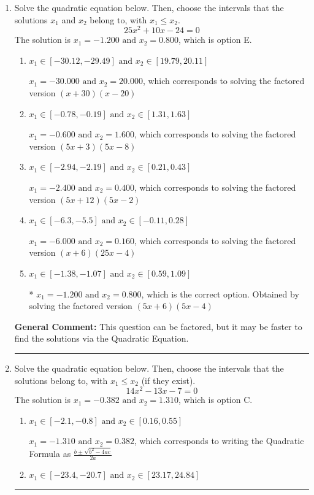 \documentclass{extbook}[14pt]
\newcommand{\litem}[1]{\item #1

\rule{\textwidth}{0.4pt}}
\begin{document}
\begin{enumerate}\litem{
Solve the quadratic equation below. Then, choose the intervals that the solutions $x_1$ and $x_2$ belong to, with $x_1 \leq x_2$.
\[ 25x^{2} +10 x -24 = 0 \]The solution is \( x_1 = -1.200 \text{ and } x_2 = 0.800 \), which is option E.\begin{enumerate}[label=\Alph*.]
\item \( x_1 \in [-30.12, -29.49] \text{ and } x_2 \in [19.79, 20.11] \)

$x_1 = -30.000 \text{ and } x_2 = 20.000$, which corresponds to solving the factored version $(x + 30)(x -20)$
\item \( x_1 \in [-0.78, -0.19] \text{ and } x_2 \in [1.31, 1.63] \)

$x_1 = -0.600 \text{ and } x_2 = 1.600$, which corresponds to solving the factored version $(5x + 3)(5x -8)$
\item \( x_1 \in [-2.94, -2.19] \text{ and } x_2 \in [0.21, 0.43] \)

$x_1 = -2.400 \text{ and } x_2 = 0.400$, which corresponds to solving the factored version $(5x + 12)(5x -2)$
\item \( x_1 \in [-6.3, -5.5] \text{ and } x_2 \in [-0.11, 0.28] \)

$x_1 = -6.000 \text{ and } x_2 = 0.160$, which corresponds to solving the factored version $(x + 6)(25x -4)$
\item \( x_1 \in [-1.38, -1.07] \text{ and } x_2 \in [0.59, 1.09] \)

* $x_1 = -1.200 \text{ and } x_2 = 0.800$, which is the correct option. Obtained by solving the factored version $(5x + 6)(5x -4)$
\end{enumerate}

\textbf{General Comment:} This question can be factored, but it may be faster to find the solutions via the Quadratic Equation.
}
\litem{
Solve the quadratic equation below. Then, choose the intervals that the solutions belong to, with $x_1 \leq x_2$ (if they exist).
\[ 14x^{2} -13 x -7 = 0 \]The solution is \( x_1 = -0.382 \text{ and } x_2 = 1.310 \), which is option C.\begin{enumerate}[label=\Alph*.]
\item \( x_1 \in [-2.1, -0.8] \text{ and } x_2 \in [0.16, 0.55] \)

 $x_1 = -1.310 \text{ and } x_2 = 0.382$, which corresponds to writing the Quadratic Formula as $\frac{b \pm \sqrt{b^2 - 4ac}}{2a}$
\item \( x_1 \in [-23.4, -20.7] \text{ and } x_2 \in [23.17, 24.84] \)


\end{enumerate}}
\end{enumerate}
\end{document}
